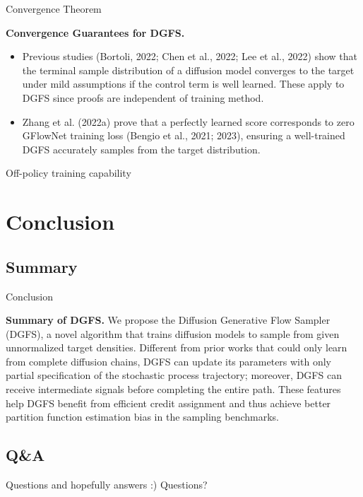 \documentclass[aspectratio=169,xcolor=dvipsnames]{beamer}
\begin{document}
\begin{frame}[t]{Convergence Theorem}
\footnotesize

\textbf{Convergence Guarantees for DGFS.}
\begin{itemize}\itemsep2pt
  \item Previous studies (Bortoli, 2022; Chen et al., 2022; Lee et al., 2022) show that the terminal sample distribution of a diffusion model converges to the target under mild assumptions if the control term is well learned. These apply to DGFS since proofs are independent of training method.
  \item Zhang et al. (2022a) prove that a perfectly learned score corresponds to zero GFlowNet training loss (Bengio et al., 2021; 2023), ensuring a well-trained DGFS accurately samples from the target distribution.
\end{itemize}

\end{frame}

\begin{frame}[t]{Off-policy training capability}
    \footnotesize

\end{frame}



\section{Conclusion}

\subsection{Summary}
\begin{frame}{Conclusion}
\footnotesize

\textbf{Summary of DGFS.} We propose the Diffusion Generative Flow Sampler (DGFS), a novel algorithm that trains diffusion models to sample from given unnormalized target densities. Different from prior works that could only learn from complete diffusion chains, DGFS can update its parameters with only partial specification of the stochastic process trajectory; moreover, DGFS can receive intermediate signals before completing the entire path. These features help DGFS benefit from efficient credit assignment and thus achieve better partition function estimation bias in the sampling benchmarks.

\end{frame}

\subsection{Q\&A}

\begin{frame}{Questions and hopefully answers :)}
    \centering
    \Huge Questions?
\end{frame}
\end{document}
